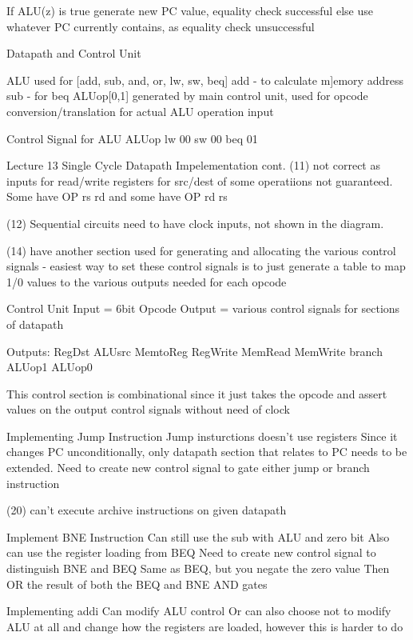 \documentclass{article}
\begin{document}
			If ALU(z) is true
				generate new PC value, equality check successful
			else
				use whatever PC currently contains, as equality check unsuccessful

	Datapath and Control Unit

		ALU used for [add, sub, and, or, lw, sw, beq]
		add - to calculate m]emory address
		sub - for beq
		ALUop[0,1] generated by main control unit, used for opcode conversion/translation for actual ALU operation input

	Control Signal for ALU
			ALUop	
		lw	00
		sw	00
		beq	01
		
Lecture 13
	Single Cycle Datapath Impelementation cont.
		(11) not correct as inputs for read/write registers for src/dest of some operatiions not guaranteed. Some have OP rs rd and some have OP rd rs

		(12) Sequential circuits need to have clock inputs, not shown in the diagram.

		(14) have another section used for generating and allocating the various control signals
		- easiest way to set these control signals is to just generate a table to map 1/0 values to the various outputs needed for each opcode

		Control Unit
			Input = 6bit Opcode
			Output = various control signals for sections of datapath

			Outputs:
				RegDst
				ALUsrc
				MemtoReg
				RegWrite
				MemRead
				MemWrite
				branch
				ALUop1
				ALUop0

			This control section is combinational since it just takes the opcode and assert values on the output control signals without need of clock

		Implementing Jump Instruction
			Jump insturctions doesn't use registers
			Since it changes PC unconditionally, only datapath section that relates to PC needs to be extended. 
			Need to create new control signal to gate either jump or branch instruction

		(20) can't execute archive instructions on given datapath 

		Implement BNE Instruction
			Can still use the sub with ALU and zero bit
			Also can use the register loading from BEQ
			Need to create new control signal to distinguish BNE and BEQ
				Same as BEQ, but you negate the zero value
			Then OR the result  of both the BEQ and BNE AND gates

		Implementing addi
			Can modify ALU control
			Or can also choose not to modify ALU at all and change how the registers are loaded, however this is harder to do
\end{document}
